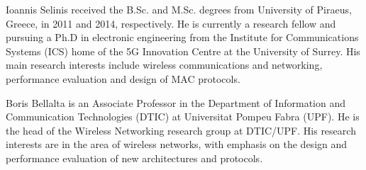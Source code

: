 \documentclass{ieeeaccess}
\begin{document}
\begin{IEEEbiography}{Ioannis Selinis} received the B.Sc. and M.Sc. degrees from University of Piraeus, Greece, in 2011 and 2014, respectively. He is currently a research fellow and pursuing a Ph.D in electronic engineering from the Institute for Communications Systems (ICS) home of the 5G Innovation Centre at the University of Surrey. His main research interests include wireless communications and networking, performance evaluation and design of MAC protocols.
\end{IEEEbiography}

\begin{IEEEbiography}{Boris Bellalta} is an Associate Professor in the Department of Information and Communication Technologies (DTIC) at Universitat Pompeu Fabra (UPF). He is the head of the Wireless Networking research group at DTIC/UPF. His research interests are in the area of wireless networks, with emphasis on the design and performance evaluation of new architectures and protocols.
\end{IEEEbiography}

\EOD
\end{document}
